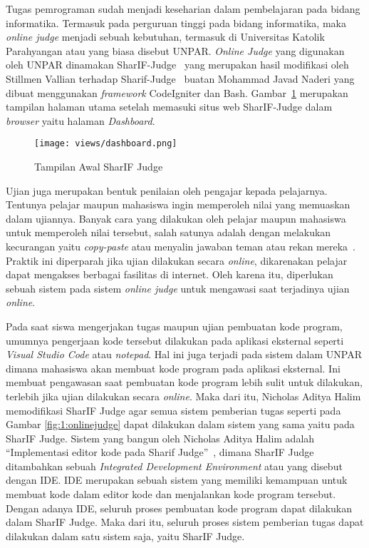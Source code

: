 \vspace{-0.25cm}

Tugas pemrograman sudah menjadi keseharian dalam pembelajaran pada bidang informatika.
Termasuk pada perguruan tinggi pada bidang informatika, maka \textit{online judge} menjadi sebuah kebutuhan, termasuk di Universitas Katolik Parahyangan atau yang biasa disebut UNPAR.
\textit{Online Judge} yang digunakan oleh UNPAR dinamakan SharIF-Judge~\cite{stillmen:sharif} yang merupakan hasil modifikasi oleh Stillmen Vallian terhadap Sharif-Judge~\cite{javed:sharif} buatan Mohammad Javad Naderi yang dibuat menggunakan \textit{framework} CodeIgniter dan Bash. Gambar~\ref{fig:1:dashboardpng} merupakan tampilan halaman utama setelah memasuki situs web SharIF-Judge dalam \textit{browser} yaitu halaman \textit{Dashboard}.

\begin{figure}[H]
    \centering
    \texttt{[image: views/dashboard.png]}
    \caption[Tampilan Awal SharIF Judge]{Tampilan Awal SharIF Judge}
    \label{fig:1:dashboardpng}
    \vspace{-0.5cm}
\end{figure}

Ujian juga merupakan bentuk penilaian oleh pengajar kepada pelajarnya. Tentunya pelajar maupun mahasiswa ingin memperoleh nilai yang memuaskan dalam ujiannya. Banyak cara yang dilakukan oleh pelajar maupun mahasiswa untuk memperoleh nilai tersebut, salah satunya adalah dengan melakukan kecurangan yaitu \textit{copy-paste} atau menyalin jawaban teman atau rekan mereka~\cite{febriana:plagiarisme}. Praktik ini diperparah jika ujian dilakukan secara \textit{online}, dikarenakan pelajar dapat mengakses berbagai fasilitas di internet. Oleh karena itu, diperlukan sebuah sistem pada sistem \textit{online judge} untuk mengawasi saat terjadinya ujian \textit{online}.

Pada saat siswa mengerjakan tugas maupun ujian pembuatan kode program, umumnya pengerjaan kode tersebut dilakukan pada aplikasi eksternal seperti \textit{Visual Studio Code} atau \textit{notepad}. Hal ini juga terjadi pada sistem dalam UNPAR dimana mahasiswa akan membuat kode program pada aplikasi eksternal. Ini membuat pengawasan saat pembuatan kode program lebih sulit untuk dilakukan, terlebih jika ujian dilakukan secara \textit{online}. Maka dari itu, Nicholas Aditya Halim memodifikasi SharIF Judge agar semua sistem pemberian tugas seperti pada Gambar \ref{fig:1:onlinejudge} dapat dilakukan dalam sistem yang sama yaitu pada SharIF Judge. Sistem yang bangun oleh Nicholas Aditya Halim adalah ``Implementasi editor kode pada Sharif Judge''~\cite{nicholas:sharif}, dimana SharIF Judge ditambahkan sebuah \textit{Integrated Development Environment} atau yang disebut dengan IDE. IDE merupakan sebuah sistem yang memiliki kemampuan untuk membuat kode dalam editor kode dan menjalankan kode program tersebut. Dengan adanya IDE, seluruh proses pembuatan kode program dapat dilakukan dalam SharIF Judge. Maka dari itu, seluruh proses sistem pemberian tugas dapat dilakukan dalam satu sistem saja, yaitu SharIF Judge.

